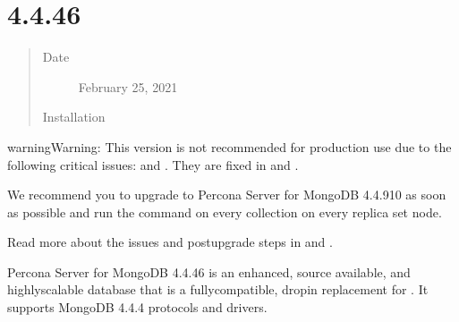 \documentclass[letterpaper,10pt,english]{sphinxmanual}
\begin{document}
\section{ 4.4.4\sphinxhyphen{}6}
\label{\detokenize{release_notes/4.4.4-6:percona-server-for-mongodb-4-4-4-6}}\label{\detokenize{release_notes/4.4.4-6:psmdb-4-4-4-6}}\label{\detokenize{release_notes/4.4.4-6::doc}}\begin{quote}\begin{description}
\item[{Date}] \leavevmode
\sphinxAtStartPar
February 25, 2021

\item[{Installation}] \leavevmode
\sphinxAtStartPar
{}

\end{description}\end{quote}

\begin{sphinxadmonition}{warning}{Warning:}
\sphinxAtStartPar
This version is not recommended for production use due to the following critical issues:  and . They are fixed in  and {\hyperref[\detokenize{release_notes/4.4.9-10:psmdb-4-4-9-10}]{}}.

\sphinxAtStartPar
We recommend you to upgrade to Percona Server for MongoDB 4.4.9\sphinxhyphen{}10 as soon as possible and run the  command on every collection on every replica set node.

\sphinxAtStartPar
Read more about the issues and post\sphinxhyphen{}upgrade steps in  and .
\end{sphinxadmonition}

\sphinxAtStartPar
Percona Server for MongoDB 4.4.4\sphinxhyphen{}6 is an enhanced, source available, and highly\sphinxhyphen{}scalable database that is a
fully\sphinxhyphen{}compatible, drop\sphinxhyphen{}in replacement for .
It supports MongoDB 4.4.4 protocols and drivers.
\end{document}
